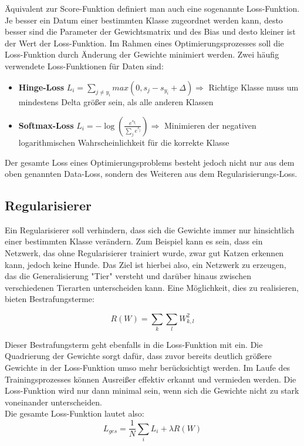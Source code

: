 \documentclass[11pt,ceqn]{book}
\begin{document}
Äquivalent zur Score-Funktion definiert man auch eine sogenannte Loss-Funktion. Je besser ein Datum einer bestimmten Klasse zugeordnet werden kann, desto besser sind die Parameter der Gewichtsmatrix und des Bias und desto kleiner ist der Wert der Loss-Funktion. Im Rahmen eines Optimierungsprozesses soll die Loss-Funktion durch Änderung der Gewichte minimiert werden.
\bigskip
Zwei häufig verwendete Loss-Funktionen für Daten sind:
\begin{itemize}
\item \textbf{Hinge-Loss} $L_i = \sum\limits_{j \neq y_i} max\left(0,s_j - s_{y_i} + \Delta\right) \Rightarrow$ Richtige Klasse muss um mindestens Delta größer sein, als alle anderen Klassen
\item \textbf{Softmax-Loss} $L_i = -\log\left(\frac{e^{s_{y_i}}}{\sum_{j} e^{s_j}}\right) \Rightarrow$ Minimieren der negativen logarithmischen Wahrscheinlichkeit für die korrekte Klasse
\end{itemize}

Der gesamte Loss eines Optimierungsproblems besteht jedoch nicht nur aus dem oben genannten Data-Loss, sondern des Weiteren aus dem Regularisierungs-Loss.

\subsection{Regularisierer}
Ein Regularisierer soll verhindern, dass sich die Gewichte immer nur hinsichtlich einer bestimmten Klasse verändern. Zum Beispiel kann es sein, dass ein Netzwerk, das ohne Regularisierer trainiert wurde, zwar gut Katzen erkennen kann, jedoch keine Hunde. Das Ziel ist hierbei also, ein Netzwerk zu erzeugen, das die Generalisierung "Tier" versteht und darüber hinaus zwischen verschiedenen Tierarten unterscheiden kann. Eine Möglichkeit, dies zu realisieren, bieten Bestrafungsterme:

\[R(W) = \sum_{k}\sum_{l} W_{k,l}^2\]

Dieser Bestrafungsterm geht ebenfalls in die Loss-Funktion mit ein. Die Quadrierung der Gewichte sorgt dafür, dass zuvor bereits deutlich größere Gewichte in der Loss-Funktion umso mehr berücksichtigt werden. Im Laufe des Trainingsprozesses können Ausreißer effektiv erkannt und vermieden werden. Die Loss-Funktion wird nur dann minimal sein, wenn sich die Gewichte nicht zu stark voneinander unterscheiden.
\\
Die gesamte Loss-Funktion lautet also:
\[L_{ges} = \frac{1}{N} \sum_{i} L_i + \lambda R(W)\]
\end{document}
